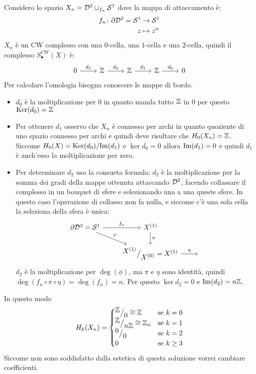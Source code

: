 \begin{example}
  Considero lo spazio $ X_n = \mathcal{D}^{2} \cup_{f_n} \mathcal{S}^{1} $ dove la mappa di attaccamento è:
  \begin{align*}
    f_n \colon \partial \mathcal{D}^{2} = \mathcal{S}^{1} & \to \mathcal{S}^{1} \\
    z & \mapsto z^n
  \end{align*}
  $ X_n $ è un CW complesso con una $ 0 $-cella, una $ 1 $-cella e una $ 2 $-cella,
  quindi il complesso $ S_\bullet^{CW}(X) $ è:
  \[
    \begin{tikzcd}
      0 \rar{d_3} & \Z \rar{d_2} & \Z \rar{d_1} & \Z \rar{d_0} & 0
    \end{tikzcd}
  \]
  Per calcolare l'omologia bisogna conoscere le mappe di bordo.
  \begin{itemize}
  \item $ d_0 $ è la moltiplicazione per $ 0 $ in quanto manda
    tutto $ \mathbb{Z} $ in $ 0 $ per questo $ \mathrm{Ker}( d_0) = \mathbb{Z} $
  \item Per ottenere $ d_1 $ osservo che $ X_n $ è connesso per archi in quanto
    quoziente di uno spazio connesso per archi e quindi deve risultare che
    $ H_0(X_n) = \mathbb{Z} $. Siccome $ H_0(X) = \mathrm{Ker}( d_0) \slash \mathrm{Im}( d_1 ) $ e
    $ \ker{d_0} = 0 $ allora $ \mathrm{Im}( d_1 ) = 0 $ e quindi $ d_1 $ è anch'esso la
    moltiplicazione per zero.
  \item Per determinare $ d_2 $ uso la consueta formula: $ d_2 $ è la
    moltiplicazione per la somma dei gradi della mappe ottenuta attaccando
    $ \mathcal{D}^{2} $, facendo collassare il complesso in un bouquet di sfere e
    selezionando una a una queste sfere. In questo caso l'operazione di collasso
    non fa nulla, e siccome c'è una sola cella la seleziona della sfera è unica:
    \[
      \begin{tikzcd}
        \partial \Disk{2} = \Sph{1} \rar{f_n} \arrow{rd}{\phi} & X^{(1)} \dar{\pi}  & {} \\
        {} & \quot{X^{(1)}}{X^{(0)}} = X^{(1)} \rar{\eta} & {}
      \end{tikzcd}
    \]
    $ d_2 $ è la moltiplicazione per $ \deg{(\phi)} $, ma $ \pi $ e $ \eta $ sono
    identità, quindi $ \deg{(f_n \circ \pi \circ \eta)} = \deg{(f_n)} = n $.
    Per questo $ \ker{d_2} = 0 $ e $ \mathrm{Im}( d_2 ) = n\mathbb{Z} $.
  \end{itemize}
  In questo modo
  \[
    H_k(X_n) =
    \begin{cases}
      {^{\textstyle \mathbb{Z}}\big/_{\textstyle 0}} \cong \mathbb{Z} & \text{se } k = 0 \\
      {^{\textstyle \mathbb{Z}}\big/_{\textstyle n \mathbb{Z}}} \cong \mathbb{Z}_n & \text{se } k = 1 \\
      {^{\textstyle 0}\big/_{\textstyle 0}} & \text{se } k = 2 \\
      0 & \text{se } k \geq 3
    \end{cases}
  \]
  Siccome non sono soddisfatto dalla estetica di questa soluzione vorrei cambiare
  coefficienti.
\end{example}
